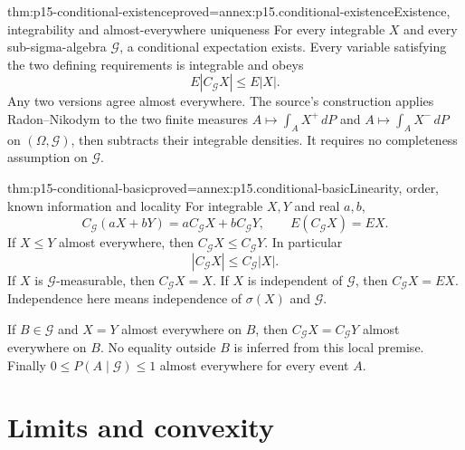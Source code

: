 \begin{hbtheorem}{thm:p15-conditional-existence}{proved=annex:p15.conditional-existence}{Existence, integrability and almost-everywhere uniqueness}
For every integrable \(X\) and every sub-sigma-algebra \(\mathcal G\),
a conditional expectation exists. Every variable satisfying the two
defining requirements is integrable and obeys
\[
                          E|C_{\mathcal G}X|\leq E|X|.
\]
Any two versions agree almost everywhere.
The source's construction applies Radon--Nikodym to the two finite measures
\(A\mapsto\int_A X^+\,dP\) and \(A\mapsto\int_A X^-\,dP\)
on \((\Omega,\mathcal G)\), then subtracts their integrable densities.
It requires no completeness assumption on \(\mathcal G\).
\end{hbtheorem}

\begin{hbtheorem}{thm:p15-conditional-basic}{proved=annex:p15.conditional-basic}{Linearity, order, known information and locality}
For integrable \(X,Y\) and real \(a,b\),
\[
 C_{\mathcal G}(aX+bY)=aC_{\mathcal G}X+bC_{\mathcal G}Y,\qquad
 E(C_{\mathcal G}X)=EX.
\]
If \(X\leq Y\) almost everywhere, then
\(C_{\mathcal G}X\leq C_{\mathcal G}Y\).
In particular
\[
                    |C_{\mathcal G}X|\leq C_{\mathcal G}|X|.
\]
If \(X\) is \(\mathcal G\)-measurable, then \(C_{\mathcal G}X=X\).
If \(X\) is independent of \(\mathcal G\), then \(C_{\mathcal G}X=EX\).
Independence here means independence of \(\sigma(X)\) and \(\mathcal G\).

If \(B\in\mathcal G\) and \(X=Y\) almost everywhere on \(B\), then
\(C_{\mathcal G}X=C_{\mathcal G}Y\) almost everywhere on \(B\).
No equality outside \(B\) is inferred from this local premise.
Finally \(0\leq P(A\mid\mathcal G)\leq1\) almost everywhere for every event \(A\).
\end{hbtheorem}

\section{Limits and convexity}
\label{sec:p15-conditional-limits}

